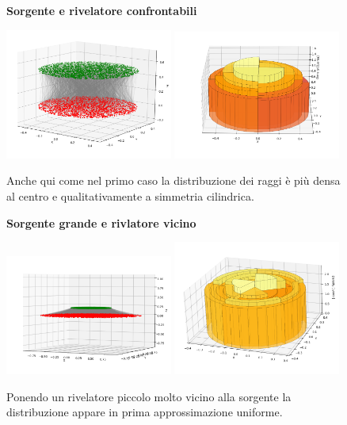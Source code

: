         \begin{figure}[ht]
            \textbf{Sorgente e rivelatore confrontabili}
            
            \centering
            \includegraphics[width=0.49\textwidth]{images/accettanza/example3.1.png}
            \includegraphics[width=0.49\textwidth]{images/accettanza/example3.2.png}
            \caption{Anche qui come nel primo caso la distribuzione dei raggi è più densa al centro e qualitativamente a simmetria cilindrica.}
        \end{figure}

        \begin{figure}[ht]
            \textbf{Sorgente grande e rivlatore vicino}
            
            \centering
            \includegraphics[width=0.49\textwidth]{images/accettanza/example4.1.png}
            \includegraphics[width=0.49\textwidth]{images/accettanza/example4.2.png}
            \caption{Ponendo un rivelatore piccolo molto vicino alla sorgente la distribuzione appare in prima approssimazione uniforme.}
        \end{figure}

        